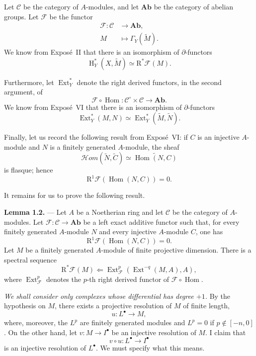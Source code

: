 \documentclass[11pt,a4paper,oneside]{book}
\providecommand{\Ab}{\mathbf{Ab}}
\providecommand{\CatC}{\mathcal C}
\providecommand{\SheafHom}{\mathcal H\!om}
\providecommand{\cF}{\mathcal F}
\providecommand{\Ext}{\operatorname{Ext}}
\providecommand{\Hloc}{\operatorname H}
\providecommand{\R}{\mathrm R}
\theoremstyle{plain}
\theoremstyle{definition}
\theoremstyle{remark}
\begin{document}
Let $\CatC$ be the category of $A$-modules, and let $\Ab$ be the category of
abelian groups. Let $\cF$ be the functor
\[
  \begin{aligned}
    \cF\colon \CatC &\longrightarrow \Ab, \\
    M &\longmapsto \Gamma_Y(\widetilde M).
  \end{aligned}
\]
We know from Expos\'e~II that there is an isomorphism of $\partial$-functors
\[
  \Hloc_Y^*(X,\widetilde M)\simeq \R^*\cF(M).
\]

Furthermore, let $\Ext_Y^*$ denote the right derived functors, in the second
argument, of
\[
  \cF\circ\operatorname{Hom}\colon \CatC^{\circ}\times\CatC\longrightarrow\Ab.
\]
We know from Expos\'e~VI that there is an isomorphism of $\partial$-functors
\[
  \Ext_Y^*(M,N)\simeq \Ext_Y^*(\widetilde M,\widetilde N).
\]

Finally, let us record the following result from Expos\'e~VI: if $C$ is an
injective $A$-module and $N$ is a finitely generated $A$-module, the sheaf
\[
  \SheafHom(\widetilde N,\widetilde C)
    \simeq \widetilde{\operatorname{Hom}(N,C)}
\]
is flasque; hence
\[
  \R^1\cF(\operatorname{Hom}(N,C))=0.
\]


It remains for us to prove the following result.

\medskip
{}\noindent\textbf{Lemma 1.2.} --- Let $A$ be a Noetherian ring and let $\CatC$
be the category of $A$-modules. Let
$\cF\colon\CatC\longrightarrow\Ab$ be a left exact additive functor such that,
for every finitely generated $A$-module $N$ and every injective $A$-module
$C$, one has
\[
  \R^1\cF(\operatorname{Hom}(N,C))=0.
\]
Let $M$ be a finitely generated $A$-module of finite projective dimension.
There is a spectral sequence
\[
  \R^\ast\cF(M)
    \Longleftarrow
  \Ext_{\cF}^{p}(\Ext^{-q}(M,A),A),
\]
where $\Ext_{\cF}^{p}$ denotes the $p$-th right derived functor of
$\cF\circ\operatorname{Hom}$.


\emph{We shall consider only complexes whose differential has degree $+1$.}
By the hypothesis on $M$, there exists a projective resolution of $M$ of
finite length,
\[
  u\colon L^\bullet\longrightarrow M,
\]
where, moreover, the $L^p$ are finitely generated modules and $L^p=0$ if
$p\notin[-n,0]$. On the other hand, let
$v\colon M\longrightarrow I^\bullet$ be an injective resolution of $M$. I
claim that
\begin{equation}
  v\circ u\colon L^\bullet\longrightarrow I^\bullet
  \tag{1.1}\label{eq:VIII.1.1}
\end{equation}
is an injective resolution of $L^\bullet$. We must specify what this means.
\end{document}

